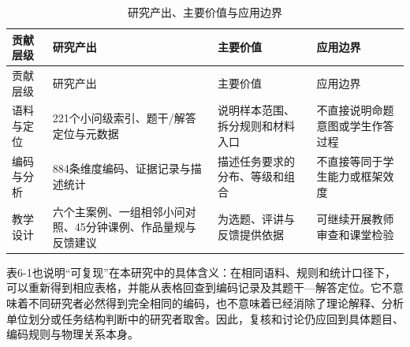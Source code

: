 \documentclass[
  12pt,
  a4paper,twoside,openany]{ctexbook}
\begin{document}
\begin{longtable}[]{@{}
  >{\raggedright\arraybackslash}p{}
  >{\raggedright\arraybackslash}p{}
  >{\raggedright\arraybackslash}p{}
  >{\raggedright\arraybackslash}p{}@{}}
\caption{研究产出、主要价值与应用边界}\tabularnewline
\toprule\noalign{}
\rowcolor{ThesisPale}
\begin{minipage}[b]{\linewidth}\raggedright
贡献层级
\end{minipage} & \begin{minipage}[b]{\linewidth}\raggedright
研究产出
\end{minipage} & \begin{minipage}[b]{\linewidth}\raggedright
主要价值
\end{minipage} & \begin{minipage}[b]{\linewidth}\raggedright
应用边界
\end{minipage} \\
\midrule\noalign{}
\endfirsthead
\toprule\noalign{}
\rowcolor{ThesisPale}
\begin{minipage}[b]{\linewidth}\raggedright
贡献层级
\end{minipage} & \begin{minipage}[b]{\linewidth}\raggedright
研究产出
\end{minipage} & \begin{minipage}[b]{\linewidth}\raggedright
主要价值
\end{minipage} & \begin{minipage}[b]{\linewidth}\raggedright
应用边界
\end{minipage} \\
\midrule\noalign{}
\endhead
\bottomrule\noalign{}
\endlastfoot
语料与定位 & 221个小问级索引、题干/解答定位与元数据 &
说明样本范围、拆分规则和材料入口 & 不直接说明命题意图或学生作答过程 \\
编码与分析 & 884条维度编码、证据记录与描述统计 &
描述任务要求的分布、等级和组合 & 不直接等同于学生能力或框架效度 \\
教学设计 & 六个主案例、一组相邻小问对照、45分钟课例、作品量规与反馈建议
& 为选题、评讲与反馈提供依据 & 可继续开展教师审查和课堂检验 \\
\end{longtable}

表6-1也说明``可复现''在本研究中的具体含义：在相同语料、规则和统计口径下，可以重新得到相应表格，并能从表格回查到编码记录及其题干---解答定位。它不意味着不同研究者必然得到完全相同的编码，也不意味着已经消除了理论解释、分析单位划分或任务结构判断中的研究者取舍。因此，复核和讨论仍应回到具体题目、编码规则与物理关系本身。
\end{document}
